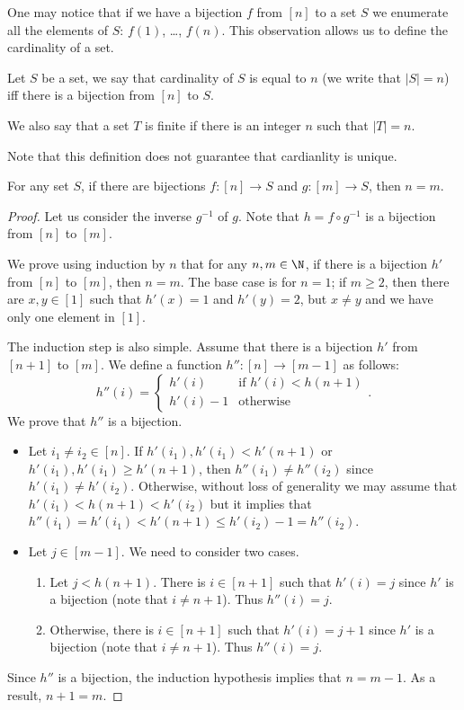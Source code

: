 One may notice that if we have a bijection $f$ from $[n]$ to a set $S$ we
enumerate all the elements of $S$: $f(1)$, \dots, $f(n)$.
This observation allows us to define the cardinality of a set.
\begin{definition}
  Let $S$ be a set, we say that cardinality of $S$ is equal to $n$ (we write
  that $|S| = n$) iff there is a bijection from $[n]$ to $S$.

  We also say that a set $T$ is finite if there is an integer $n$ such that
  $|T| = n$.
\end{definition}

Note that this definition does not guarantee that cardianlity is unique.
\begin{theorem}
  For any set $S$, if there are bijections $f : [n] \to S$ and $g : [m] \to S$,
  then $n = m$.
\end{theorem}
\begin{proof}
  Let us consider the inverse $g^{-1}$ of $g$. Note that $h = f \circ g^{-1}$
  is a bijection from $[n]$ to $[m]$.

  We prove using induction by $n$ that for any $n, m \in \N$,
  if there is a bijection $h'$ from $[n]$ to $[m]$, then $n = m$.
  The base case is for $n = 1$; if $m \ge 2$,
  then there are $x, y \in [1]$ such that $h'(x) = 1$ and $h'(y) = 2$, but
  $x \neq y$ and we have only one element in $[1]$.

  The induction step is also simple. Assume that there is a bijection $h'$ from
  $[n + 1]$ to $[m]$. We define a function $h'' : [n] \to [m - 1]$ as follows:
  \[
    h''(i) =
    \begin{cases}
      h'(i) & \text{if } h'(i) < h(n + 1) \\
      h'(i) - 1 & \text{otherwise}
    \end{cases}.
  \]
  We prove that $h''$ is a bijection.
  \begin{itemize}
    \item Let $i_1 \neq i_2 \in [n]$. If $h'(i_1), h'(i_1) < h'(n + 1)$ or
      $h'(i_1), h'(i_1) \ge h'(n + 1)$, then $h''(i_1) \neq h''(i_2)$ since
      $h'(i_1) \neq h'(i_2)$. Otherwise, without loss of generality we
      may assume that $h'(i_1) < h(n + 1) < h'(i_2)$ but it implies that
      $h''(i_1) = h'(i_1) < h'(n + 1) \le h'(i_2) - 1 = h''(i_2)$.
    \item Let $j \in [m - 1]$. We need to consider two cases.
      \begin{enumerate}
        \item Let $j < h(n + 1)$. There is $i \in [n + 1]$ such that
          $h'(i) = j$ since $h'$ is a bijection (note that $i \neq n + 1$).
          Thus $h''(i) = j$.
        \item Otherwise, there is $i \in [n + 1]$ such that
          $h'(i) = j + 1$ since $h'$ is a bijection (note that $i \neq n + 1$).
          Thus $h''(i) = j$.
      \end{enumerate}
  \end{itemize}
  Since $h''$ is a bijection, the induction hypothesis implies that $n = m - 1$.
  As a result, $n + 1 = m$.
\end{proof}

